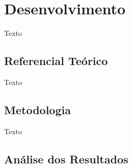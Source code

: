\chapter{Desenvolvimento}

Texto

\section{Referencial Teórico}

Texto

\section{Metodologia}

Texto

\section{Análise dos Resultados}

